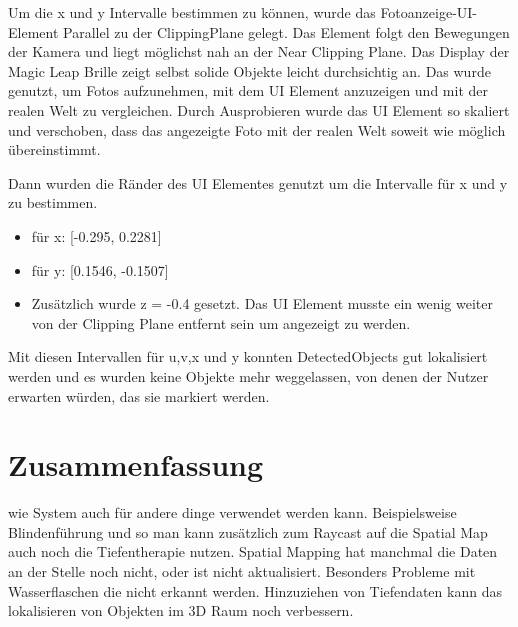 \documentclass[german,a4paper, 12pt]{llncs}
\begin{document}
Um die x und y Intervalle bestimmen zu können, wurde das Fotoanzeige-UI-Element Parallel zu der ClippingPlane gelegt. Das Element folgt den Bewegungen der Kamera und liegt möglichst nah an der Near Clipping Plane. Das Display der Magic Leap Brille zeigt selbst solide Objekte leicht durchsichtig an. Das wurde genutzt, um Fotos aufzunehmen, mit dem UI Element anzuzeigen und mit der realen Welt zu vergleichen. Durch Ausprobieren wurde das UI Element so skaliert und verschoben, dass das angezeigte Foto mit der realen Welt soweit wie möglich übereinstimmt.

Dann wurden die Ränder des UI Elementes genutzt um die Intervalle für x und y zu bestimmen.
\begin{itemize}
	\item für x: [-0.295, 0.2281]
	\item für y: [0.1546, -0.1507]
	\item Zusätzlich wurde z = -0.4 gesetzt. Das UI Element musste ein wenig weiter von der Clipping Plane entfernt sein um angezeigt zu werden.
\end{itemize}

Mit diesen Intervallen für u,v,x und y konnten DetectedObjects gut lokalisiert werden und es wurden keine Objekte mehr weggelassen, von denen der Nutzer erwarten würden, das sie markiert werden.



\section{Zusammenfassung}

wie System auch für andere dinge verwendet werden kann. Beispielsweise Blindenführung und so
man kann zusätzlich zum Raycast auf die Spatial Map auch noch die Tiefentherapie nutzen. Spatial Mapping hat manchmal die Daten an der Stelle noch nicht, oder ist nicht aktualisiert. Besonders Probleme mit Wasserflaschen die nicht erkannt werden. Hinzuziehen von Tiefendaten kann das lokalisieren von Objekten im 3D Raum noch verbessern.

	
\newpage
\printbibliography
\end{document}
